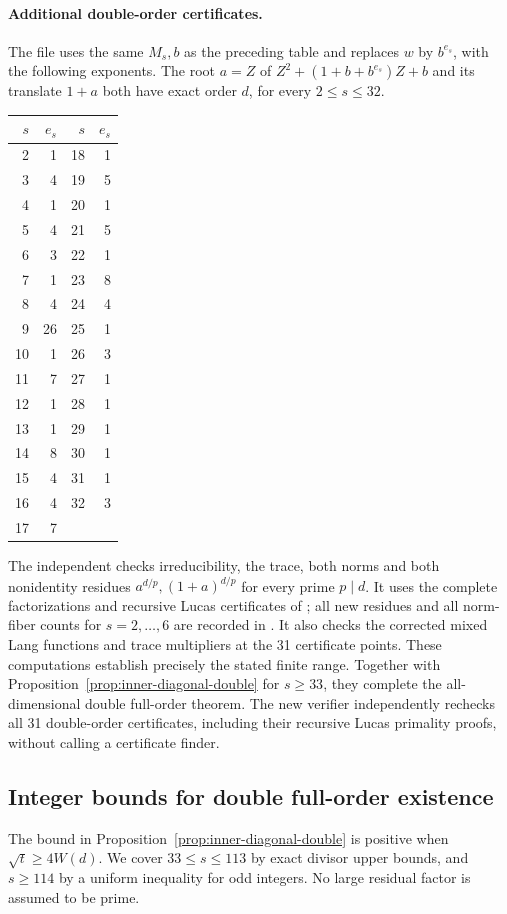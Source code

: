 \documentclass[11pt]{article}
\begin{document}
\paragraph{Additional double-order certificates.}
The file  uses the same
$M_s,b$ as the preceding table and replaces $w$ by $b^{e_s}$, with
the following exponents. The root $a=Z$ of
$Z^2+(1+b+b^{e_s})Z+b$ and its translate $1+a$ both have exact
order $d$, for every $2\le s\le32$.
\begin{center}\small
\begin{tabular}{rr|rr}
$s$&$e_s$&$s$&$e_s$\\\hline
2&1&18&1\\
3&4&19&5\\
4&1&20&1\\
5&4&21&5\\
6&3&22&1\\
7&1&23&8\\
8&4&24&4\\
9&26&25&1\\
10&1&26&3\\
11&7&27&1\\
12&1&28&1\\
13&1&29&1\\
14&8&30&1\\
15&4&31&1\\
16&4&32&3\\
17&7&&\\
\end{tabular}
\end{center}
The independent  checks irreducibility,
the trace, both norms and both nonidentity residues
$a^{d/p},(1+a)^{d/p}$ for every prime $p\mid d$. It uses the
complete factorizations and recursive Lucas certificates of
; all new residues and all
norm-fiber counts for $s=2,\ldots,6$ are recorded in
. It also checks the corrected
mixed Lang functions and trace multipliers at the 31 certificate points.
These computations establish precisely the stated finite range.
Together with Proposition~\ref{prop:inner-diagonal-double} for $s\ge33$,
they complete the all-dimensional double full-order theorem.
The new verifier  independently
rechecks all 31 double-order certificates, including their recursive
Lucas primality proofs, without calling a certificate finder.

\subsection*{Integer bounds for double full-order existence}
The bound in Proposition~\ref{prop:inner-diagonal-double} is positive
when $\sqrt t\ge4W(d)$. We cover $33\le s\le113$ by exact divisor
upper bounds, and $s\ge114$ by a uniform inequality for odd integers.
No large residual factor is assumed to be prime.
\end{document}
